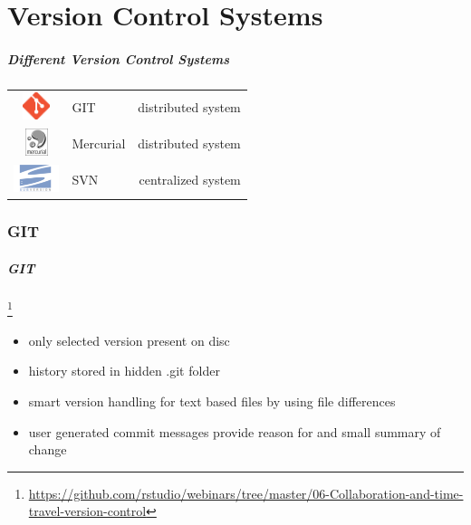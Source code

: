 \documentclass[
t, %
10pt, %
aspectratio=1610, %
ngerman,
english,
]{beamer}
\newcommand\blfootnote[1]{%
  \begingroup
  \renewcommand\thefootnote{}\footnote{#1}%
  \addtocounter{footnote}{-1}%
  \endgroup
}
\begin{document}
\part{Version Control Systems}
\makepart

\begin{frame}
    \frametitle{Different Version Control Systems}
    \centering
    \vfill
    \begin{tabular}{ c l r }
        \includegraphics[height=0.8cm]{graphics/giticon_orange.eps} & \large{GIT} &  distributed system\\
        \includegraphics[height=0.8cm]{graphics/Mercurial_logo.png} & \large{Mercurial} &  distributed system\\
        \includegraphics[height=0.8cm]{graphics/Subversion_Logo.png} & \large{SVN} &  centralized system\\
    \end{tabular}
    \vfill
\end{frame}

\section{GIT}
\begin{frame}
    \frametitle{GIT}
    \blfootnote{\url{https://github.com/rstudio/webinars/tree/master/06-Collaboration-and-time-travel-version-control}}
    \begin{minipage}{0.5\textwidth}
	\begin{itemize}
	    \item only selected version present on disc
	    \item history stored in hidden .git folder
	    \item smart version handling for text based files by using file differences
	    \item user generated commit messages provide reason for and small summary of change
	\end{itemize}
    \end{minipage}
    \hfill
    \begin{minipage}{0.5\textwidth}
	
    \end{minipage}
\end{frame}
\end{document}
